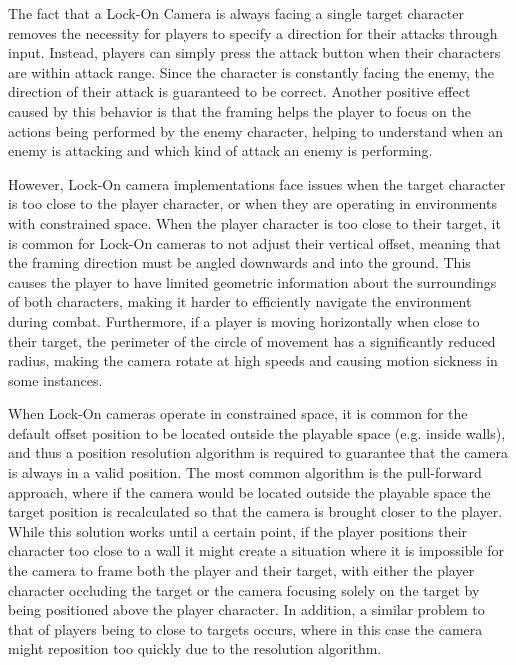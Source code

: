 The fact that a Lock-On Camera is always facing a single target character removes the necessity for players to specify a direction for their attacks through input. Instead, players can simply press the attack button when their characters are within attack range. Since the character is constantly facing the enemy, the direction of their attack is guaranteed to be correct. Another positive effect caused by this behavior is that the framing helps the player to focus on the actions being performed by the enemy character, helping to understand when an enemy is attacking and which kind of attack an enemy is performing.

However, Lock-On camera implementations face issues when the target character is too close to the player character, or when they are operating in environments with constrained space. When the player character is too close to their target, it is common for Lock-On cameras to not adjust their vertical offset, meaning that the framing direction must be angled downwards and into the ground. This causes the player to have limited geometric information about the surroundings of both characters, making it harder to efficiently navigate the environment during combat. Furthermore, if a player is moving horizontally when close to their target, the perimeter of the circle of movement has a significantly reduced radius, making the camera rotate at high speeds and causing motion sickness in some instances.

When Lock-On cameras operate in constrained space, it is common for the default offset position to be located outside the playable space (e.g. inside walls), and thus a position resolution algorithm is required to guarantee that the camera is always in a valid position. The most common algorithm is the pull-forward approach, where if the camera would be located outside the playable space the target position is recalculated so that the camera is brought closer to the player. While this solution works until a certain point, if the player positions their character too close to a wall it might create a situation where it is impossible for the camera to frame both the player and their target, with either the player character occluding the target or the camera focusing solely on the target by being positioned above the player character. In addition, a similar problem to that of players being to close to targets occurs, where in this case the camera might reposition too quickly due to the resolution algorithm.

